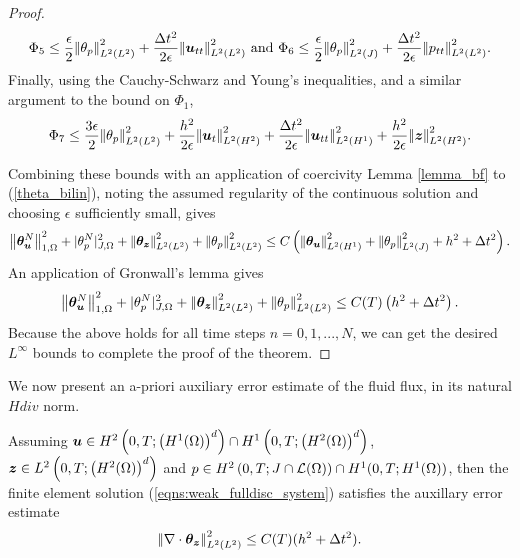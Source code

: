 \begin{proof}
\begin{equation*}
\label{eqn:rhs_6}
\Phi_{5} \leq  \frac{ \epsilon}{2} \ltwotimenorm{\auxp}^{2} + \frac{\Delta t^{2} }{2\epsilon}  \ltwotimenorm{\dispcont_{tt}}^{2} \mbox{ and }
\Phi_{6} \leq  \frac{ \epsilon}{2} \jtimenorm{\auxp}^{2} + \frac{ \Delta t^{2} }{2\epsilon}   \ltwotimenorm{p_{tt}}^{2}.
\end{equation*}
Finally, using the Cauchy-Schwarz and Young's inequalities, and a similar argument to the bound on $\Phi_1$,
\begin{equation*}
\label{eqn:rhs_7}
\Phi_{7} \leq  \frac{ 3\epsilon }{2} \ltwotimenorm{\auxp}^{2} + \frac{h^2 }{2\epsilon}  \htwotimenorm{ \dispcont_t}^{2} + \frac{\Delta t^{2}}{2\epsilon} \honetimenorm{\dispcont_{tt}}^{2} + \frac{ h^2 }{2\epsilon}  \htwotimenorm{\fluxcont}^2.
\end{equation*}


\noindent Combining these bounds with an application of coercivity Lemma \ref{lemma_bf} to (\ref{theta_bilin}), noting the assumed regularity of the continuous solution and  choosing $\epsilon$ sufficiently small, gives
\begin{equation}
\label{eqn:combine_results_1}
\honenorm{\auxdisp^{N}}^{2} + \jnorm{\auxp^{N}}^{2}  +  \ltwotimenorm{\auxflux}^{2}  + \ltwotimenorm{\auxp}^{2}
\leq  C\left( \honetimenorm{\auxdisp}^{2} + \jtimenorm{\auxp}^{2} + h^2 + \Delta t^2 \right).
\end{equation}
An application of Gronwall's lemma gives
\begin{equation*}
{\left\vert\kern-0.25ex\left\vert \boldsymbol{\theta}_{\boldsymbol{u}}^{N} \right\vert\kern-0.25ex\right\vert}_{1,\Omega}^{2} + |{{\theta}_{{p}}^{N}}|_{J,\Omega}^{2}  +  {\left\vert\kern-0.25ex\left\vert \boldsymbol{\theta}_{\boldsymbol{z}} \right\vert\kern-0.25ex\right\vert}_{L^{2}(L^{2})}^{2}  + {\left\vert\kern-0.25ex\left\vert {\theta}_{{p}} \right\vert\kern-0.25ex\right\vert}_{L^{2}(L^{2})}^{2}
   \leq   C(T) \left( h^2 + \Delta t^2 \right).
\end{equation*}
Because the above holds for all time steps $n=0, 1,..., N$, we can get the desired $L^{\infty}$ bounds to complete the proof of the theorem.
\end{proof}


We now present an a-priori auxiliary error estimate of the fluid flux, in its natural $Hdiv$ norm.
\begin{lemma}
\label{fully_discrete_div_error}
Assuming $\boldsymbol{u}  \in H^{2}\left(0,T; \left(H^{1}(\Omega) \right)^{d}\right)  \cap H^1\left( 0,T; \left( H^2(\Omega) \right)^d \right)$, $ \boldsymbol{z} \in L^{2}\left(0,T;\left(H^{2}(\Omega) \right)^{d}\right)$ and $ p \in   H^{2}\left(0,T;J \cap \mathcal{L}(\Omega) \right) \cap H^1(0,T;H^1(\Omega)) $, then the finite element solution (\ref{eqns:weak_fulldisc_system}) satisfies the auxillary error estimate
\begin{eqnarray}
{\left\vert\kern-0.25ex\left\vert \nabla \cdot \boldsymbol{\theta}_{\boldsymbol{z}}\right\vert\kern-0.25ex\right\vert}_{L^{2}(L^{2})}^{2} \leq C(T) ( h^2+ \Delta t^2).
\end{eqnarray}
\end{lemma}

